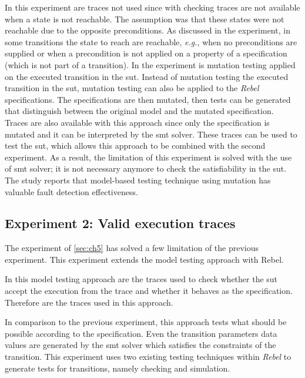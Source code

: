 In this experiment are traces not used since with checking traces are not
available when a state is not reachable. The assumption was that these states
were not reachable due to the opposite preconditions. As discussed in the
experiment, in some transitions the state to reach are reachable, \textit{e.g.},
when no preconditions are supplied or when a precondition is not applied on a
property of a specification (which is not part of a transition). In the
experiment is mutation testing applied on the executed transition in the
\gls{sut}. Instead of mutation testing the executed transition in the
\gls{sut}, mutation testing can also be applied to the \textit{Rebel}
specifications.
The specifications are then mutated, then tests can be generated that
distinguish between the original model and the mutated
specification.~\cite[p.~8]{utting2012taxonomy}
Traces are also available with this approach since only the specification is
mutated and it can be interpreted by the \gls{smt} solver. These traces can be
used to test the \gls{sut}, which allows this approach to be combined with the
second experiment. As a result, the limitation of this experiment is solved
with the use of \gls{smt} solver; it is not necessary anymore to check the
satisfiability in the \gls{sut}. The study \cite{paradkar2005case} reports that
model-based testing technique using mutation has valuable fault detection
effectiveness.


\subsection{Experiment 2: Valid execution traces}
The experiment of \autoref{sec:ch5} has solved a few limitation of the previous experiment. This experiment extends the model testing approach with Rebel.

In this model testing approach are the traces used to check whether the \gls{sut} accept the execution from the trace and whether it behaves as the specification. Therefore are the traces used in this approach.

In comparison to the previous experiment, this approach tests what should be possible according to the specification. Even the transition parameters data values are generated by the \gls{smt} solver which satisfies the constraints of the transition. This experiment uses two existing testing techniques within \textit{Rebel} to generate tests for transitions, namely checking and simulation.

